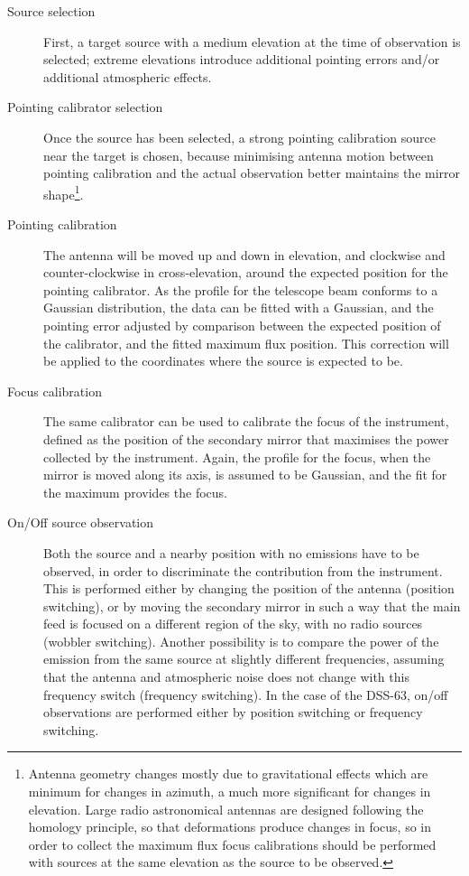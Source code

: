			\begin{description}
				\item[Source selection] First, a target source with
				a medium elevation at the time of observation is
				selected; extreme elevations introduce additional
				pointing errors and/or additional atmospheric
				effects.
				
				\item[Pointing calibrator selection] Once the
				source has been selected, a strong pointing
				calibration source near the target is chosen,
				because minimising antenna motion between pointing
				calibration
				and the actual observation better maintains the
				mirror shape\footnote{Antenna geometry changes
				mostly due to gravitational effects which are
				minimum for changes in azimuth, a much more
				significant for changes in elevation. Large radio
				astronomical antennas are designed following the
				homology principle, so that deformations produce
				changes in focus, so in order to collect the
				maximum flux focus calibrations should be
				performed with sources at the same elevation as
				the source to be observed.}.
				
				\item[Pointing calibration] The antenna will be
				moved up and down in elevation, and clockwise and
				counter-clockwise in cross-elevation, around the
				expected position for the pointing calibrator. As
				the profile for the telescope beam conforms to a
				Gaussian distribution, the data can be fitted with
				a Gaussian, and the pointing error adjusted by
				comparison between the expected position of the
				calibrator, and the fitted maximum flux position.
				This correction will be applied to the coordinates
				where the source is expected to be.
				
				\item[Focus calibration] The same calibrator can be
				used to calibrate the focus of the instrument,
				defined as the position of the secondary mirror
				that maximises the power collected by the
				instrument. Again, the profile for the focus, when
				the mirror is moved along its axis, is assumed to
				be Gaussian, and the fit for the maximum
				provides the focus.
				
				\item[On/Off source observation] Both the source
				and a nearby position with no emissions have to be
				observed, in order to discriminate the contribution
				from the instrument. This is performed either by
				changing the position of the antenna (position
				switching), or by moving the secondary mirror in
				such a way that the main feed is focused on a
				different region of the sky, with no radio sources
				(wobbler switching). Another possibility is to
				compare the power of the emission from the same
				source at slightly different frequencies, assuming
				that the antenna and atmospheric noise does not
				change with this frequency switch (frequency
				switching). In the case of the DSS-63, on/off
				observations are performed either by position
				switching or frequency switching.
				

\end{description}
